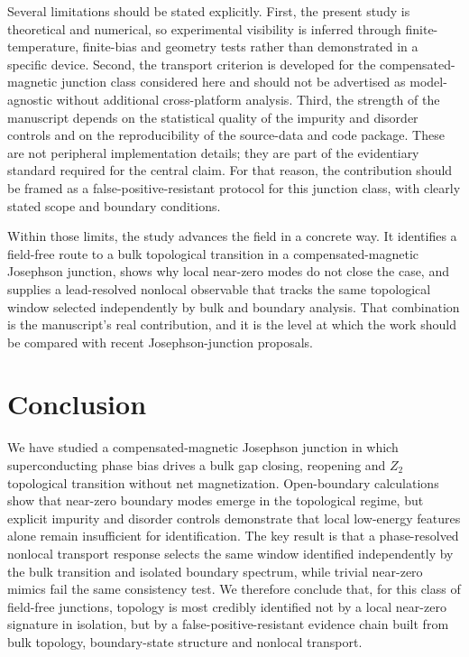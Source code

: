 Several limitations should be stated explicitly. First, the present study is theoretical and numerical, so experimental visibility is inferred through finite-temperature, finite-bias and geometry tests rather than demonstrated in a specific device. Second, the transport criterion is developed for the compensated-magnetic junction class considered here and should not be advertised as model-agnostic without additional cross-platform analysis. Third, the strength of the manuscript depends on the statistical quality of the impurity and disorder controls and on the reproducibility of the source-data and code package. These are not peripheral implementation details; they are part of the evidentiary standard required for the central claim. For that reason, the contribution should be framed as a false-positive-resistant protocol for this junction class, with clearly stated scope and boundary conditions.

Within those limits, the study advances the field in a concrete way. It identifies a field-free route to a bulk topological transition in a compensated-magnetic Josephson junction, shows why local near-zero modes do not close the case, and supplies a lead-resolved nonlocal observable that tracks the same topological window selected independently by bulk and boundary analysis. That combination is the manuscript's real contribution, and it is the level at which the work should be compared with recent Josephson-junction proposals.

\section*{Conclusion}

We have studied a compensated-magnetic Josephson junction in which superconducting phase bias drives a bulk gap closing, reopening and $Z_2$ topological transition without net magnetization. Open-boundary calculations show that near-zero boundary modes emerge in the topological regime, but explicit impurity and disorder controls demonstrate that local low-energy features alone remain insufficient for identification. The key result is that a phase-resolved nonlocal transport response selects the same window identified independently by the bulk transition and isolated boundary spectrum, while trivial near-zero mimics fail the same consistency test. We therefore conclude that, for this class of field-free junctions, topology is most credibly identified not by a local near-zero signature in isolation, but by a false-positive-resistant evidence chain built from bulk topology, boundary-state structure and nonlocal transport.

